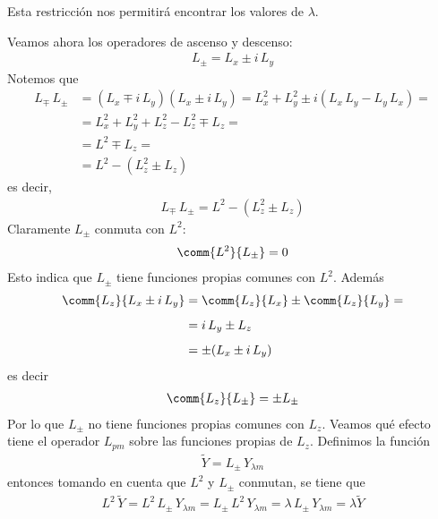 Esta restricción nos permitirá encontrar los valores de $\lambda$.
\par
Veamos ahora los operadores de ascenso y descenso:
\begin{align}
L_{\pm} = L_{x} \pm i \, L_{y}
\label{eq:ecuacion_10_131}
\end{align}
Notemos que
\begin{align*}
L_{\mp} \, L_{\pm} &= (L_{x} \mp i \, L_{y})(L_{x} \pm i \, L_{y}) = L_{x}^{2} + L_{y}^{2} \pm i (L_{x} \,L_{y} - L_{y} \,L_{x}) = \\[0.5em]
&= L_{x}^{2} + L_{y}^{2} + L_{z}^{2} - L_{z}^{2} \mp L_{z} = \\[0.5em]
&= L^{2} \mp L_{z} = \\[0.5em]
&= L^{2} - (L_{z}^{2} \pm L_{z})
\end{align*}
es decir,
\begin{align}
L_{\mp} \, L_{\pm} = L^{2} - (L_{z}^{2} \pm L_{z})
\label{eq:ecuacion_10_132}
\end{align}
Claramente $L_{\pm}$ conmuta con $L^{2}$:
\begin{align}
\comm{L^{2}}{L_{\pm}} = 0
\label{eq:ecuacion_10_133}
\end{align}
Esto indica que $L_{\pm}$ tiene funciones propias comunes con $L^{2}$. Además
\begin{align}
\comm{L_{z}}{L_{x} \pm i \, L_{y}} &= \comm{L_{z}}{L_{x}} \pm \comm{L_{z}}{L_{y}} = \nonumber \\[0.5em]
&= i \, L_{y} \pm L_{z} \nonumber \\[0.5em]
&= \pm (L_{x} \pm i \, L_{y}) 
\label{eq:ecuacion_10_134}
\end{align}
es decir
\begin{align}
\comm{L_{z}}{L_{\pm}} = \pm L_{\pm}
\label{eq:ecuacion_10_135}
\end{align}
Por lo que $L_{\pm}$ no tiene funciones propias comunes con $L_{z}$.
Veamos qué efecto tiene el operador $L_{pm}$ sobre las funciones propias de $L_{z}$. Definimos la función
\begin{align}
\tilde{Y} = L_{\pm} \, Y_{\lambda m}
\label{eq:ecuacion_10_136}
\end{align}
entonces tomando en cuenta que $L^{2}$ y $L_{\pm}$ conmutan, se tiene que
\begin{align}
L^{2} \, \tilde{Y} = L^{2} \, L_{\pm} \, Y_{\lambda m} = L_{\pm} \, L^{2} \, Y_{\lambda m} = \lambda \, L_{\pm} \, Y_{\lambda m} = \lambda \tilde{Y} 
\label{eq:ecuacion_10_137}
\end{align}


